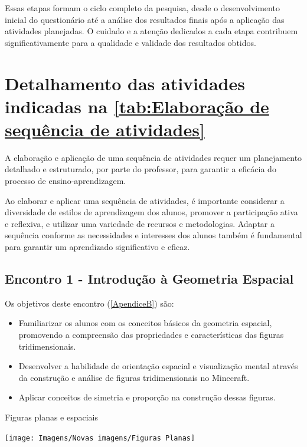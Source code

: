 Essas etapas formam o ciclo completo da pesquisa, desde o desenvolvimento inicial do questionário até a análise dos resultados finais após a aplicação das atividades planejadas. O cuidado e a atenção dedicados a cada etapa contribuem significativamente para a qualidade e validade dos resultados obtidos.

\section{Detalhamento das atividades indicadas na \autoref{tab:Elaboração de sequência de atividades}}

A elaboração e aplicação de uma sequência de atividades requer um planejamento detalhado e estruturado, por parte do professor, para garantir a eficácia do processo de ensino-aprendizagem.

Ao elaborar e aplicar uma sequência de atividades, é importante considerar a diversidade de estilos de aprendizagem dos alunos, promover a participação ativa e reflexiva, e utilizar uma variedade de recursos e metodologias. Adaptar a sequência conforme as necessidades e interesses dos alunos também é fundamental para garantir um aprendizado significativo e eficaz.

\subsection{Encontro 1 - Introdução à Geometria Espacial}

Os objetivos deste encontro (\autoref{ApendiceB}) são:

\begin{itemize}
    \item Familiarizar os alunos com os conceitos básicos da geometria espacial, promovendo a compreensão das propriedades e características das figuras tridimensionais.
    \item Desenvolver a habilidade de orientação espacial e visualização mental através da construção e análise de figuras tridimensionais no Minecraft.
    \item Aplicar conceitos de simetria e proporção na construção dessas figuras.
\end{itemize}

\begin{CenteredFigure}
    \caption{Figuras planas e espaciais} \label{fig:00-Figuras planas e espaciais}
    \texttt{[image: Imagens/Novas imagens/Figuras Planas]}
    \legend{\autoria}
\end{CenteredFigure}

